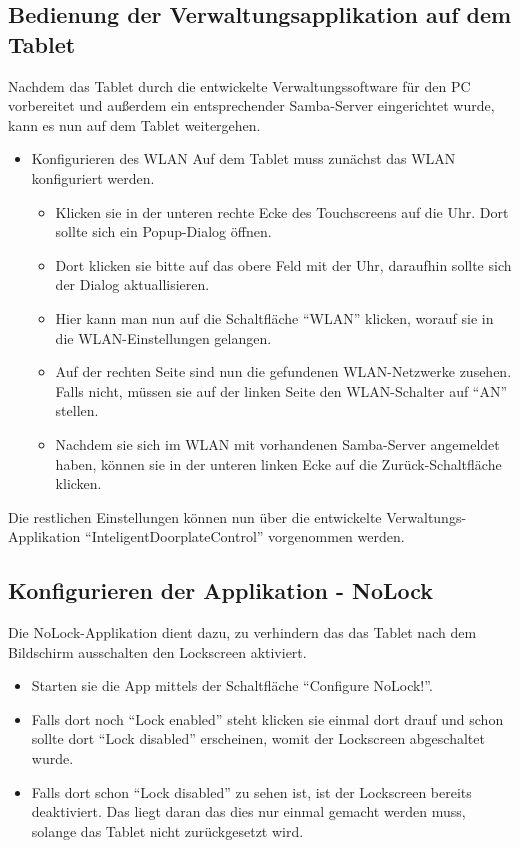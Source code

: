 \begin{flushleft}
\section{Bedienung der Verwaltungsapplikation auf dem Tablet}
  Nachdem das Tablet durch die entwickelte Verwaltungssoftware für den PC vorbereitet und außerdem ein entsprechender Samba-Server eingerichtet wurde, kann es nun auf dem Tablet weitergehen.
  \begin{itemize}
  \item{Konfigurieren des WLAN}
    Auf dem Tablet muss zunächst das WLAN konfiguriert werden.
    \begin{itemize}
      \item Klicken sie in der unteren rechte Ecke des Touchscreens auf die Uhr. Dort sollte sich ein Popup-Dialog öffnen.
      \item Dort klicken sie bitte auf das obere Feld mit der Uhr, daraufhin sollte sich der Dialog aktuallisieren.
      \item Hier kann man nun auf die Schaltfläche ``WLAN'' klicken, worauf sie in die WLAN-Einstellungen gelangen.
      \item Auf der rechten Seite sind nun die gefundenen WLAN-Netzwerke zusehen. Falls nicht, müssen sie auf der linken Seite den WLAN-Schalter auf ``AN'' stellen.
      \item Nachdem sie sich im WLAN mit vorhandenen Samba-Server angemeldet haben, können sie in der unteren linken Ecke auf die Zurück-Schaltfläche klicken.
    \end{itemize}
  \end{itemize}
  Die restlichen Einstellungen können nun über die entwickelte Verwaltungs-Applikation ``InteligentDoorplateControl'' vorgenommen werden.
  \subsection{Konfigurieren der Applikation - NoLock}
    Die NoLock-Applikation dient dazu, zu verhindern das das Tablet nach dem Bildschirm ausschalten den Lockscreen aktiviert.
    \begin{itemize}
      \item Starten sie die App mittels der Schaltfläche ``Configure NoLock!''.
      \item Falls dort noch ``Lock enabled'' steht klicken sie einmal dort drauf und schon sollte dort ``Lock disabled'' erscheinen, womit der Lockscreen abgeschaltet wurde.
      \item Falls dort schon ``Lock disabled'' zu sehen ist, ist der Lockscreen bereits deaktiviert. Das liegt daran das dies nur einmal gemacht werden muss, solange das Tablet nicht zurückgesetzt wird.
    \end{itemize}

\end{flushleft}
